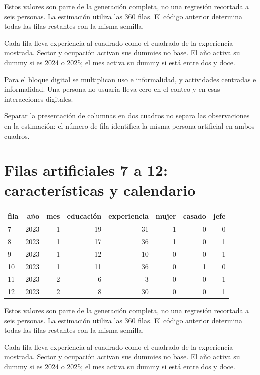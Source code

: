 \documentclass[11pt,a4paper]{article}
\begin{document}
Estos valores son parte de la generación completa, no una regresión recortada a seis personas. La estimación utiliza las 360 filas. El código anterior determina todas las filas restantes con la misma semilla.

Cada fila lleva experiencia al cuadrado como el cuadrado de la experiencia mostrada. Sector y ocupación activan sus dummies no base. El año activa su dummy si es 2024 o 2025; el mes activa su dummy si está entre dos y doce.

Para el bloque digital se multiplican uso e informalidad, y actividades centradas e informalidad. Una persona no usuaria lleva cero en el conteo y en esas interacciones digitales.

Separar la presentación de columnas en dos cuadros no separa las observaciones en la estimación: el número de fila identifica la misma persona artificial en ambos cuadros.

\clearpage
\section{Filas artificiales 7 a 12: características y calendario}

\begin{center}\small
\begin{tabular}{lrrrrrrr}
\toprule
fila & año & mes & educación & experiencia & mujer & casado & jefe\\\midrule
7 & 2023 & 1 & 19 & 31 & 1 & 0 & 0\\
8 & 2023 & 1 & 17 & 36 & 1 & 0 & 1\\
9 & 2023 & 1 & 12 & 10 & 0 & 0 & 1\\
10 & 2023 & 1 & 11 & 36 & 0 & 1 & 0\\
11 & 2023 & 2 & 6 & 3 & 0 & 0 & 1\\
12 & 2023 & 2 & 8 & 30 & 0 & 0 & 1\\
\bottomrule
\end{tabular}\end{center}

Estos valores son parte de la generación completa, no una regresión recortada a seis personas. La estimación utiliza las 360 filas. El código anterior determina todas las filas restantes con la misma semilla.

Cada fila lleva experiencia al cuadrado como el cuadrado de la experiencia mostrada. Sector y ocupación activan sus dummies no base. El año activa su dummy si es 2024 o 2025; el mes activa su dummy si está entre dos y doce.
\end{document}
